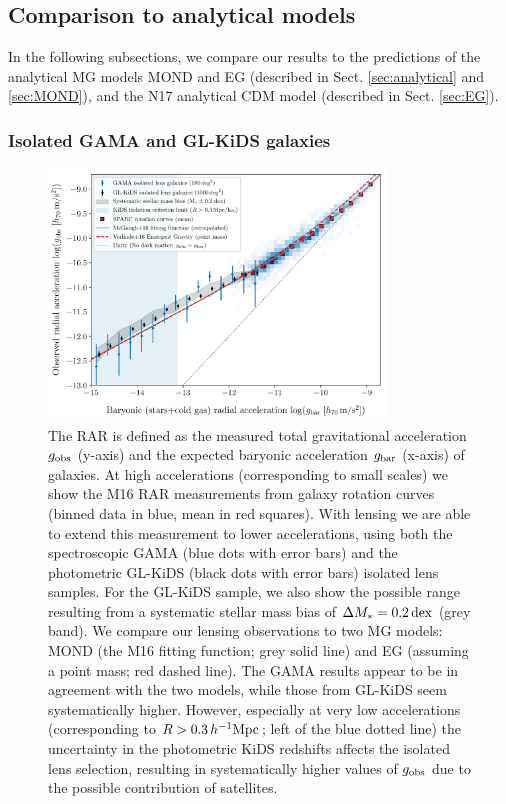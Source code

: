 \documentclass[usenatbib]{mnras}
\newcommand{\hMpc}{\, h^{-1}{\rm{Mpc}} }
\newcommand{\un}[1]{_{\rm #1}}
\newcommand{\dex}{\, {\rm dex}}
\begin{document}
\subsection{Comparison to analytical models}
\label{sec:results-analytical}

In the following subsections, we compare our results to the predictions of the analytical MG models MOND and EG (described in Sect. \ref{sec:analytical} and \ref{sec:MOND}), and the N17 analytical CDM model (described in Sect. \ref{sec:EG}).

\subsubsection{Isolated GAMA and GL-KiDS galaxies}

\begin{figure}
	\includegraphics[width=0.8\textwidth]{Figures/RAR_KiDS+GAMA+Verlinde_Nobins_isolated_zoomout.pdf}
	\caption{The RAR is defined as the measured total gravitational acceleration $g\un{obs}$ (y-axis) and the expected baryonic acceleration $g\un{bar}$ (x-axis) of galaxies. At high accelerations (corresponding to small scales) we show the M16 RAR measurements from galaxy rotation curves (binned data in blue, mean in red squares). With lensing we are able to extend this measurement to lower accelerations, using both the spectroscopic GAMA (blue dots with error bars) and the photometric GL-KiDS (black dots with error bars) isolated lens samples. For the GL-KiDS sample, we also show the possible range resulting from a systematic stellar mass bias of $\Delta M_*=0.2 \dex$ (grey band). We compare our lensing observations to two MG models: MOND (the M16 fitting function; grey solid line) and EG (assuming a point mass; red dashed line). The GAMA results appear to be in agreement with the two models, while those from GL-KiDS seem systematically higher. However, especially at very low accelerations (corresponding to $R > 0.3 \hMpc$; left of the blue dotted line) the uncertainty in the photometric KiDS redshifts affects the isolated lens selection, resulting in systematically higher values of $g\un{obs}$ due to the possible contribution of satellites.}
	\label{fig:RAR_kids_gama_verlinde}
\end{figure}
\end{document}
